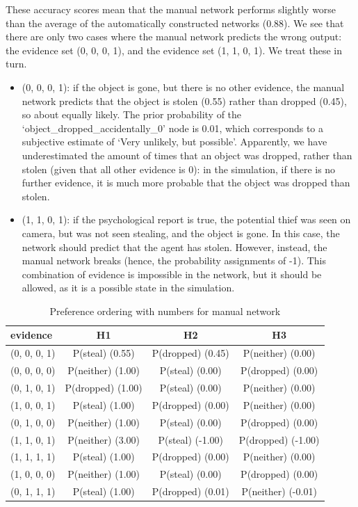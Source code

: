 \documentclass[12pt]{article}
\begin{document}
These accuracy scores mean that the manual network performs slightly worse than the average of the automatically constructed networks (0.88). We see that there are only two cases where the manual network predicts the wrong output: the evidence set (0, 0, 0, 1), and the evidence set (1, 1, 0, 1). We treat these in turn.

\begin{itemize}
\item (0, 0, 0, 1): if the object is gone, but there is no other evidence, the manual network predicts that the object is stolen (0.55) rather than dropped (0.45), so about equally likely. The prior probability of the `object\_dropped\_accidentally\_0' node is 0.01, which corresponds to a subjective estimate of `Very unlikely, but possible'. Apparently, we have underestimated the amount of times that an object was dropped, rather than stolen (given that all other evidence is 0): in the simulation, if there is no further evidence, it is much more probable that the object was dropped than stolen.
\item (1, 1, 0, 1): if the psychological report is true, the potential thief was seen on camera, but was not seen stealing, and the object is gone. In this case, the network should predict that the agent has stolen. However, instead, the manual network breaks (hence, the probability assignments of -1). This combination of evidence is impossible in the network, but it should be allowed, as it is a possible state in the simulation.
\end{itemize}



\begin{table}
\centering
\small
\begin{tabular}{|l|c|c|c|}
\hline
evidence & H1 & H2 & H3 \\
\hline
(0, 0, 0, 1)&P(steal) (0.55) & P(dropped) (0.45) & P(neither) (0.00) \\
(0, 0, 0, 0)&P(neither) (1.00) & P(steal) (0.00) & P(dropped) (0.00) \\
(0, 1, 0, 1)&P(dropped) (1.00) & P(steal) (0.00) & P(neither) (0.00) \\
(1, 0, 0, 1)&P(steal) (1.00) & P(dropped) (0.00) & P(neither) (0.00) \\
(0, 1, 0, 0)&P(neither) (1.00) & P(steal) (0.00) & P(dropped) (0.00) \\
(1, 1, 0, 1)&P(neither) (3.00) & P(steal) (-1.00) & P(dropped) (-1.00) \\
(1, 1, 1, 1)&P(steal) (1.00) & P(dropped) (0.00) & P(neither) (0.00) \\
(1, 0, 0, 0)&P(neither) (1.00) & P(steal) (0.00) & P(dropped) (0.00) \\
(0, 1, 1, 1)&P(steal) (1.00) & P(dropped) (0.01) & P(neither) (-0.01) \\
\hline
\end{tabular}
\caption{ Preference ordering with numbers for manual network}
\label{wife}
\end{table}%
\end{document}

